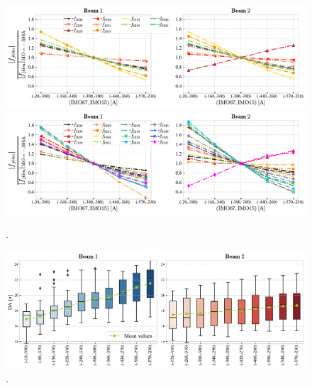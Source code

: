\documentclass{cernatsnote}
\begin{document}
\begin{figure}[h!]
\centering
\includegraphics[width=1\textwidth]{images/rdt3_octfamilybase.pdf}
\includegraphics[width=1\textwidth]{images/rdt4_octfamilybase.pdf}
\caption{\label{fig_rdt_octfamily} .}
\end{figure}

\begin{figure}[h!]
\centering
\includegraphics[width=1\textwidth]{images/da_vs_octfamily_b12.pdf}
\caption{\label{fig_da_octfamily} .}
\end{figure}
\end{document}
